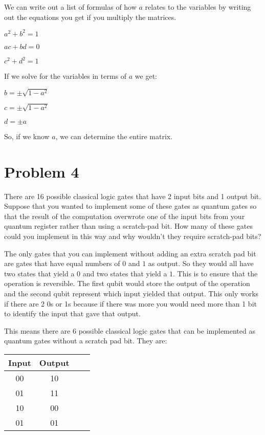 \documentclass[12pt]{article}
\begin{document}
We can write out a list of formulas of how $a$ relates to the variables by writing out the equations you get if you multiply the matrices.

$ a^2 + b^2 = 1 $

$ ac + bd = 0 $

$ c^2 + d^2 = 1 $

If we solve for the variables in terms of $a$ we get:

$ b = \pm \sqrt{1 - a^2} $

$ c = \pm \sqrt{1 - a^2} $

$ d = \pm a $

So, if we know $a$, we can determine the entire matrix.

\section*{Problem 4}
\begin{questionbox}
	There are 16 possible classical logic gates that have 2 input bits and 1
	output bit. Suppose that you wanted to implement some of these gates
	as quantum gates so that the result of the computation overwrote one of
	the input bits from your quantum register rather than using a scratch-pad
	bit. How many of these gates could you implement in this way and why
	wouldn't they require scratch-pad bits?
\end{questionbox}

The only gates that you can implement without adding an extra scratch pad bit are gates that have equal numbers of $0$ and $1$ as output. So they would all have two states that yield a $0$ and two states that yield a $1$. This is to ensure that the operation is reversible. The first qubit would store the output of the operation and the second qubit represent which input yielded that output. This only works if there are 2 0s or 1s because if there was more you would need more than 1 bit to identify the input that gave that output.

This means there are 6 possible classical logic gates that can be implemented as quantum gates without a scratch pad bit. They are:

\begin{center}
\begin{tabular}{|c|c|c|c|}
\hline
Input & Output  \\
\hline
00 & 10 \\
01 & 11 \\
10 & 00 \\
01 & 01 \\
\hline
\end{tabular}
\end{center}
\end{document}
